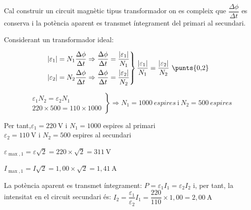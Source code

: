 \begin{solapartat}
Cal construir un circuit magnètic tipus transformador on es compleix que $\dfrac{\Delta\phi}{\Delta t}$ es conserva i la potència aparent es transmet íntegrament del primari al secundari. 

Considerant un transformador ideal:

\begin{minipage}[c]{0.58\linewidth}
\[ \left.\begin{aligned} &|\varepsilon_1| = N_1\frac{\Delta\phi}{\Delta t} \Rightarrow \frac{\Delta\phi}{\Delta t} = \frac{|\varepsilon_1|}{N_1}\\ &|\varepsilon_2| = N_2\frac{\Delta\phi}{\Delta t} \Rightarrow \frac{\Delta\phi}{\Delta t} = \frac{|\varepsilon_2|}{N_2}\end{aligned}\right\}\frac{|\varepsilon_1|}{N_1} = \frac{|\varepsilon_2|}{N_2}\ \text{\punts{0,2}} \]
\end{minipage}\hfill
\begin{minipage}[c]{0.38\linewidth}
\end{minipage}

\[ \left.\begin{aligned} &\varepsilon_1 N_2 = \varepsilon_2 N_1\\ &220\times 500 = 110\times 1000\end{aligned}\right\} \Rightarrow N_1 = 1000\ \textit{espires}\ \text{i}\ N_2 = 500\ \textit{espires} \]

 Per tant,\quad $\varepsilon_1 = 220\ \mathrm{V}$ i $N_1 = 1000$ espires al primari\\
$\varepsilon_2 = 110\ \mathrm{V}$ i $N_2 = 500$ espires al secundari
\end{solapartat}

\begin{solapartat}
 $\varepsilon_{\max,1} = \varepsilon\sqrt{2} = 220\times\sqrt{2} = 311\ \mathrm{V}$

 $I_{\max,1} = I\sqrt{2} = 1,00\times\sqrt{2} = 1,41\ \mathrm{A}$

La potència aparent es transmet íntegrament: $P = \varepsilon_1 I_1 = \varepsilon_2 I_2$  i, per tant, la intensitat en el circuit secundari és: $I_2 = \dfrac{\varepsilon_1}{\varepsilon_2}I_1 = \dfrac{220}{110}\times 1,00 = 2,00\ \mathrm{A}$ 
\end{solapartat}
